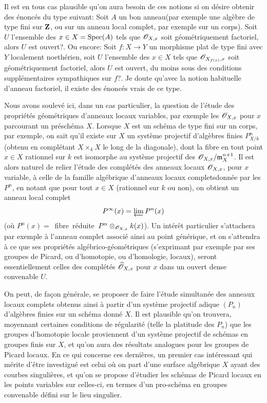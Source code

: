 Il est en tous cas plausible qu'on aura besoin de ces notions si on d\'esire obtenir des \'enonc\'es du type suivant: Soit $A$ un \og bon anneau\fg (par exemple une alg\`ebre de type fini sur $\mathbf{Z}$, ou sur un anneau local complet, par exemple sur un corps). Soit~$U$ l'ensemble des $x\in X=\operatorname{Spec}(A)$ tels que $\mathscr{O}_{X, x}$ soit \og g\'eom\'etriquement factoriel\fg, alors $U$ est ouvert?. Ou encore: Soit $f\colon X\to Y$ un morphisme plat de type fini avec $Y$ localement noeth\'erien, soit $U$ l'ensemble des $x\in X$ tels que ${\mathscr O}_{X_{f(x)}, x}$ soit \og g\'eom\'etriquement factoriel\fg, alors $U$ est ouvert, du moins sous des conditions suppl\'ementaires sympathiques sur $f$?. Je doute qu'avec la notion habituelle d'anneau factoriel, il existe des \'enonc\'es vrais de ce type.

Nous avons soulev\'e ici, dans un cas particulier, la question de l'\'etude des propri\'et\'es g\'eom\'etriques d'anneaux locaux \og variables\fg, par exemple les $\mathscr{O}_{X, x}$ pour $x$ parcourant un pr\'esch\'ema $X$. Lorsque $X$ est un sch\'ema de type fini sur un corps, par exemple, on sait qu'il existe sur $X$ un syst\`eme projectif d'alg\`ebres finies $P^n_{X/k}$ (obtenu en compl\'etant $X\times_k X$ le long de la diagonale), dont la fibre en tout point $x\in X$ rationnel sur $k$ est isomorphe au syst\`eme projectif des $\mathscr{O}_{X, x}/\mathfrak{m}_X^{n+1}$. Il est alors naturel de relier l'\'etude des compl\'et\'es des anneaux locaux $\mathscr{O}_{X, x}$, pour $x$ variable, \`a celle de la \og famille alg\'ebrique d'anneaux locaux complets\fg donn\'ee par les $P^n$, en notant que pour tout $x\in X$ (rationnel sur $k$ ou non), on obtient un anneau local complet
$$
P^{\infty}(x)=\varprojlim P^n(x)
$$
(o\`u $P^n(x)=$~fibre~r\'eduite~$P^n\otimes_{\mathscr{O}_{X, x}}k(x)$). Un int\'er\^et particulier s'attachera par exemple \`a l'anneau complet associ\'e ainsi au point g\'en\'erique, et on s'attendra \`a ce que ses propri\'et\'es alg\'ebrico-g\'eom\'etriques (s'exprimant par exemple par ses groupes de Picard, ou d'homotopie, ou d'homologie, locaux), seront essentiellement celles des compl\'et\'es $\widehat{{\mathscr O}}_{X, x}$ pour $x$ dans un ouvert dense convenable $U$.

On peut, de fa\c con g\'en\'erale, se proposer de faire l'\'etude simultan\'ee des anneaux locaux complets obtenus ainsi \`a partir d'un syst\`eme projectif adique $(P_n)$ d'alg\`ebres finies sur un sch\'ema donn\'e $X$. Il est plausible qu'on trouvera, moyennant certaines conditions de r\'egularit\'e (telle la platitude des $P_n$) que les groupes d'homotopie locale proviennent d'un syst\`eme projectif de sch\'emas en groupes finis sur $X$, et qu'on aura des r\'esultats analogues pour les groupes de Picard locaux. En ce qui concerne ces derni\`eres, un premier cas int\'eressant qui m\'erite d'\^etre investigu\'e est celui o\`u on part d'une surface alg\'ebrique $X$ ayant des courbes singuli\`eres, et qu'on se propose d'\'etudier les sch\'emas de Picard locaux en les points variables sur celles-ci, en termes d'un pro-sch\'ema en groupes convenable d\'efini sur le lieu singulier.


